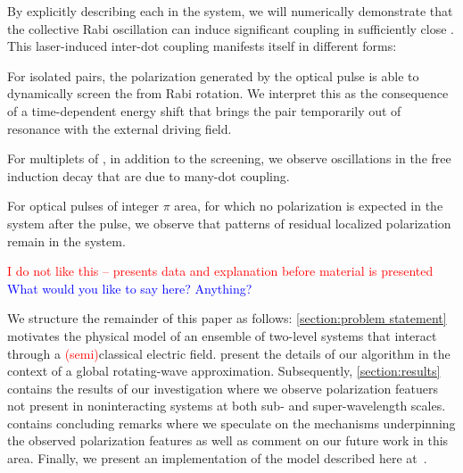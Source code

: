 By explicitly describing each \qd{} in the system, we will numerically demonstrate  that the collective Rabi oscillation can induce significant coupling in sufficiently close \qds{}.
This laser-induced inter-dot coupling manifests itself in different forms:
\begin{inparaenum}[(i)]
  \item For isolated \qd{} pairs, the polarization generated by the optical pulse is able to dynamically screen the \qds{} from Rabi rotation.
    We interpret this as the consequence of a time-dependent energy shift that brings the pair temporarily out of resonance with the external driving field.
  \item For multiplets of \qds{}, in addition to the screening, we observe oscillations in the free induction decay that are due to many-dot coupling.
  \item For optical pulses of integer $\pi$ area, for which no polarization is expected in the system after the pulse, we observe that patterns of residual localized polarization remain in the system.
\end{inparaenum}
\textcolor{red}{I do not like this -- presents data and explanation before material is presented}
\textcolor{blue}{What would you like to say here? Anything?}

We structure the remainder of this paper as follows: \cref{section:problem statement} motivates the physical model of an ensemble of two-level systems that interact through a \textcolor{red}{(semi)}classical electric field.
 present the details of our algorithm in the context of a global rotating-wave approximation.
Subsequently, \cref{section:results} contains the results of our investigation where we observe polarization featuers not present in noninteracting systems at both sub- and super-wavelength scales.
 contains concluding remarks where we speculate on the mechanisms underpinning the observed polarization features as well as comment on our future work in this area.
Finally, we present an implementation of the model described here at~\cite{githubpage}.
